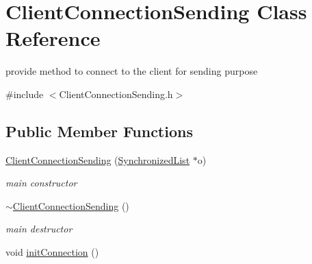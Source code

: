 \hypertarget{class_client_connection_sending}{\section{Client\-Connection\-Sending Class Reference}
\label{class_client_connection_sending}
}


provide method to connect to the client for sending purpose  




{\ttfamily \#include $<$Client\-Connection\-Sending.\-h$>$}

\subsection*{Public Member Functions}
\begin{DoxyCompactItemize}
\item 
\hyperlink{class_client_connection_sending_a4bd1618c88ecf3d1c615f822db712e3d}{Client\-Connection\-Sending} (\hyperlink{class_synchronized_list}{Synchronized\-List} $\ast$o)
\begin{DoxyCompactList}\small\item\em main constructor \end{DoxyCompactList}\item 
\hypertarget{class_client_connection_sending_a9f38a9ed716468834d7a7244a807869f}{\hyperlink{class_client_connection_sending_a9f38a9ed716468834d7a7244a807869f}{$\sim$\-Client\-Connection\-Sending} ()}\label{class_client_connection_sending_a9f38a9ed716468834d7a7244a807869f}

\begin{DoxyCompactList}\small\item\em main destructor \end{DoxyCompactList}\item 
\hypertarget{class_client_connection_sending_a3d8637f8bdd5a88d3ed4b8fc529a81c3}{void \hyperlink{class_client_connection_sending_a3d8637f8bdd5a88d3ed4b8fc529a81c3}{init\-Connection} ()}\label{class_client_connection_sending_a3d8637f8bdd5a88d3ed4b8fc529a81c3}


\end{DoxyCompactItemize}
